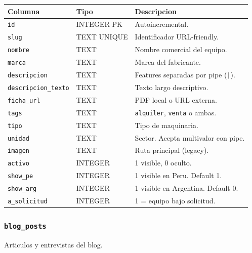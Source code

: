 \documentclass[11pt,a4paper]{article}
\begin{document}
\begin{longtable}{p{3.5cm} p{2cm} p{8cm}}
\toprule
\textbf{Columna} & \textbf{Tipo} & \textbf{Descripcion} \\
\midrule
\endhead
\texttt{id}                 & INTEGER PK  & Autoincremental. \\
\texttt{slug}               & TEXT UNIQUE & Identificador URL-friendly. \\
\texttt{nombre}             & TEXT        & Nombre comercial del equipo. \\
\texttt{marca}              & TEXT        & Marca del fabricante. \\
\texttt{descripcion}        & TEXT        & Features separadas por pipe (\texttt{|}). \\
\texttt{descripcion\_texto} & TEXT        & Texto largo descriptivo. \\
\texttt{ficha\_url}         & TEXT        & PDF local o URL externa. \\
\texttt{tags}               & TEXT        & \texttt{alquiler}, \texttt{venta} o ambas. \\
\texttt{tipo}               & TEXT        & Tipo de maquinaria. \\
\texttt{unidad}             & TEXT        & Sector. Acepta multivalor con pipe. \\
\texttt{imagen}             & TEXT        & Ruta principal (legacy). \\
\texttt{activo}             & INTEGER     & 1 visible, 0 oculto. \\
\texttt{show\_pe}           & INTEGER     & 1 visible en Peru. Default 1. \\
\texttt{show\_arg}          & INTEGER     & 1 visible en Argentina. Default 0. \\
\texttt{a\_solicitud}       & INTEGER     & 1 = equipo bajo solicitud. \\
\bottomrule
\end{longtable}

\subsubsection{\texttt{blog\_posts}}
Articulos y entrevistas del blog.
\end{document}
